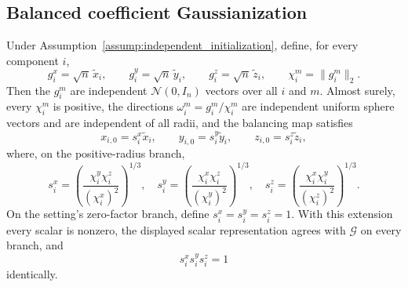 \subsection{Balanced coefficient Gaussianization}\label{app:step-002}

\begin{lemma}
\label{lem:step-002-balancing-scalars}
Under Assumption~\ref{assump:independent_initialization}, define, for every
component \(i\),
\[
  g_i^x=\sqrt n\,\widetilde x_i,
  \qquad g_i^y=\sqrt n\,\widetilde y_i,
  \qquad g_i^z=\sqrt n\,\widetilde z_i,
  \qquad \chi_i^m=\|g_i^m\|_2.
\]
Then the \(g_i^m\) are independent \(\mathcal N(0,I_n)\) vectors over all
\(i\) and \(m\). Almost surely, every \(\chi_i^m\) is positive, the directions
\(\omega_i^m=g_i^m/\chi_i^m\) are independent uniform sphere vectors and are
independent of all radii, and the balancing map satisfies
\[
  x_{i,0}=s_i^x\widetilde x_i,\qquad
  y_{i,0}=s_i^y\widetilde y_i,\qquad
  z_{i,0}=s_i^z\widetilde z_i,
\]
where, on the positive-radius branch,
\[
  s_i^x=\left(\frac{\chi_i^y\chi_i^z}{(\chi_i^x)^2}\right)^{1/3},
  \quad
  s_i^y=\left(\frac{\chi_i^x\chi_i^z}{(\chi_i^y)^2}\right)^{1/3},
  \quad
  s_i^z=\left(\frac{\chi_i^x\chi_i^y}{(\chi_i^z)^2}\right)^{1/3}.
\]
On the setting's zero-factor branch, define
\(s_i^x=s_i^y=s_i^z=1\). With this extension every scalar is nonzero, the
displayed scalar representation agrees with \(\mathcal G\) on every branch,
and
\[
  s_i^x s_i^y s_i^z=1
\]
identically.

\end{lemma}

